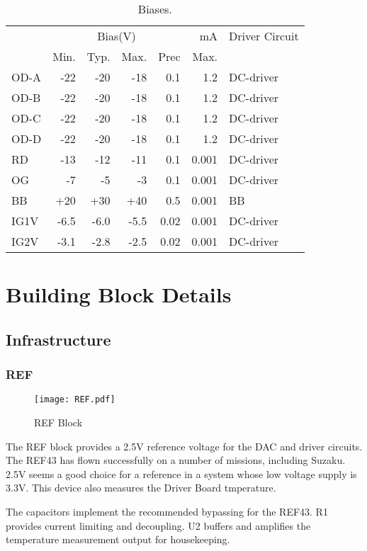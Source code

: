 \begin{table}[h]
\centering
\begin{tabular}{|l|rrrr|r|l|}
\hline
&\multicolumn{4}{c|}{Bias(V)} &mA&Driver Circuit \\
&Min.& Typ.& Max.&Prec& Max.&\\
\hline
OD-A &-22 &-20& -18& 0.1&1.2&DC-driver \\
OD-B &-22 &-20& -18& 0.1&1.2&DC-driver \\
OD-C &-22 &-20& -18& 0.1&1.2&DC-driver \\
OD-D &-22 &-20& -18& 0.1&1.2&DC-driver \\
RD &-13& -12 &-11& 0.1&0.001&DC-driver \\
OG& -7& -5& -3&  0.1&0.001&DC-driver \\
BB &+20 &+30 &+40 &0.5&0.001&BB \\
IG1V&-6.5&-6.0&-5.5&0.02&0.001&DC-driver \\
IG2V&-3.1&-2.8&-2.5&0.02&0.001&DC-driver \\
\hline
\end{tabular}
 \caption{Biases.}
 \label{Biases}
\end{table}



\section{Building Block Details}
\subsection{Infrastructure}
\subsubsection{REF}
   \begin{figure}
   \begin{center}
   \texttt{[image: REF.pdf]}
   \end{center}
   \caption{REF Block}
   \end{figure}

The REF block provides a 2.5V reference voltage for the DAC and driver circuits. The REF43 has flown successfully on a number of missions, including Suzaku. 2.5V seems a good choice for a reference in a system whose low voltage supply is 3.3V. This device also measures the Driver Board tmperature. 

The capacitors implement the recommended bypassing for the REF43.
R1 provides current limiting and decoupling. U2 buffers and amplifies the temperature measurement output for housekeeping.



